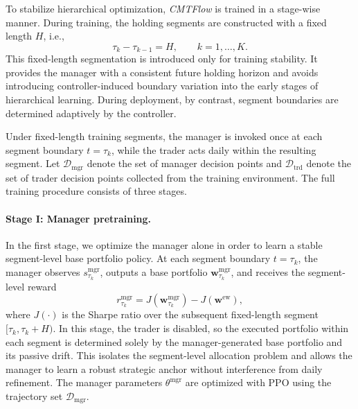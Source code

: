 \documentclass[letterpaper]{article} %
\begin{document}
To stabilize hierarchical optimization, \textit{CMTFlow} is trained in a stage-wise manner. During training, the holding segments are constructed with a fixed length \(H\), i.e.,
\[
\tau_k-\tau_{k-1}=H,\qquad k=1,\dots,K.
\]
This fixed-length segmentation is introduced only for training stability. It provides the manager with a consistent future holding horizon and avoids introducing controller-induced boundary variation into the early stages of hierarchical learning. During deployment, by contrast, segment boundaries are determined adaptively by the controller.

Under fixed-length training segments, the manager is invoked once at each segment boundary \(t=\tau_k\), while the trader acts daily within the resulting segment. Let \(\mathcal{D}_{\mathrm{mgr}}\) denote the set of manager decision points and \(\mathcal{D}_{\mathrm{trd}}\) denote the set of trader decision points collected from the training environment. The full training procedure consists of three stages.

\paragraph{Stage I: Manager pretraining.}
In the first stage, we optimize the manager alone in order to learn a stable segment-level base portfolio policy. At each segment boundary \(t=\tau_k\), the manager observes \(s_{\tau_k}^{\mathrm{mgr}}\), outputs a base portfolio \(\mathbf{w}^{\mathrm{mgr}}_{\tau_k}\), and receives the segment-level reward
\[
r_{\tau_k}^{\mathrm{mgr}}
=
J\!\left(\mathbf{w}^{\mathrm{mgr}}_{\tau_k}\right)
-
J\!\left(\mathbf{w}^{\mathrm{ew}}\right),
\]
where \(J(\cdot)\) is the Sharpe ratio over the subsequent fixed-length segment \([\tau_k,\tau_k+H)\). In this stage, the trader is disabled, so the executed portfolio within each segment is determined solely by the manager-generated base portfolio and its passive drift. This isolates the segment-level allocation problem and allows the manager to learn a robust strategic anchor without interference from daily refinement. The manager parameters \(\theta^{\mathrm{mgr}}\) are optimized with PPO using the trajectory set \(\mathcal{D}_{\mathrm{mgr}}\).
\end{document}
